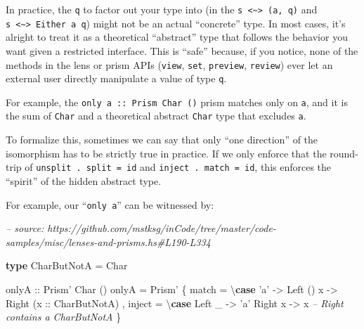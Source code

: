 \documentclass[]{article}
\newenvironment{Shaded}{}{}
\newcommand{\CharTok}[1]{\textcolor[rgb]{0.25,0.44,0.63}{#1}}
\newcommand{\CommentTok}[1]{\textcolor[rgb]{0.38,0.63,0.69}{\textit{#1}}}
\newcommand{\DataTypeTok}[1]{\textcolor[rgb]{0.56,0.13,0.00}{#1}}
\newcommand{\FunctionTok}[1]{\textcolor[rgb]{0.02,0.16,0.49}{#1}}
\newcommand{\KeywordTok}[1]{\textcolor[rgb]{0.00,0.44,0.13}{\textbf{#1}}}
\newcommand{\NormalTok}[1]{#1}
\newcommand{\OtherTok}[1]{\textcolor[rgb]{0.00,0.44,0.13}{#1}}
\begin{document}
In practice, the \texttt{q} to factor out your type into (in the
\texttt{s\ \textless{}\textasciitilde{}\textgreater{}\ (a,\ q)} and
\texttt{s\ \textless{}\textasciitilde{}\textgreater{}\ Either\ a\ q}) might not
be an actual ``concrete'' type. In most cases, it's alright to treat it as a
theoretical ``abstract'' type that follows the behavior you want given a
restricted interface. This is ``safe'' because, if you notice, none of the
methods in the lens or prism APIs (\texttt{view}, \texttt{set},
\texttt{preview}, \texttt{review}) ever let an external user directly manipulate
a value of type \texttt{q}.

For example, the
\texttt{only\ \textquotesingle{}a\textquotesingle{}\ ::\ Prism\textquotesingle{}\ Char\ ()}
prism matches only on \texttt{\textquotesingle{}a\textquotesingle{}}, and it is
the sum of \texttt{Char} and a theoretical abstract \texttt{Char} type that
excludes \texttt{\textquotesingle{}a\textquotesingle{}}.

To formalize this, sometimes we can say that only ``one direction'' of the
isomorphism has to be strictly true in practice. If we only enforce that the
round-trip of \texttt{unsplit\ .\ split\ =\ id} and
\texttt{inject\ .\ match\ =\ id}, this enforces the ``spirit'' of the hidden
abstract type.

For example, our ``\texttt{only\ \textquotesingle{}a\textquotesingle{}}'' can be
witnessed by:

\begin{Shaded}
\begin{Highlighting}[]
\CommentTok{-- source: https://github.com/mstksg/inCode/tree/master/code-samples/misc/lenses-and-prisms.hs#L190-L334}

\KeywordTok{type} \DataTypeTok{CharButNotA} \FunctionTok{=} \DataTypeTok{Char}

\OtherTok{onlyA ::} \DataTypeTok{Prism'} \DataTypeTok{Char}\NormalTok{ ()}
\NormalTok{onlyA }\FunctionTok{=} \DataTypeTok{Prism'}
\NormalTok{    \{ match  }\FunctionTok{=}\NormalTok{ \textbackslash{}}\KeywordTok{case}
        \CharTok{'a'} \OtherTok{->} \DataTypeTok{Left}\NormalTok{ ()}
\NormalTok{        x   }\OtherTok{->} \DataTypeTok{Right}\NormalTok{ (}\OtherTok{x ::} \DataTypeTok{CharButNotA}\NormalTok{)}
\NormalTok{    , inject }\FunctionTok{=}\NormalTok{ \textbackslash{}}\KeywordTok{case}
        \DataTypeTok{Left}\NormalTok{  _ }\OtherTok{->} \CharTok{'a'}
        \DataTypeTok{Right}\NormalTok{ x }\OtherTok{->}\NormalTok{ x        }\CommentTok{-- Right contains a CharButNotA}
\NormalTok{    \}}
\end{Highlighting}
\end{Shaded}
\end{document}
